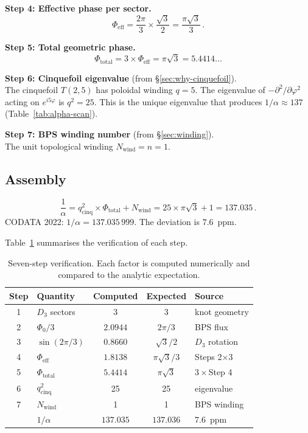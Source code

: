 \documentclass[11pt]{article}
\begin{document}
\medskip
\noindent\textbf{Step 4: Effective phase per sector.}
\[
\Phi_\text{eff} = \frac{2\pi}{3} \times \frac{\sqrt{3}}{2}
= \frac{\pi\sqrt{3}}{3}\,.
\]

\medskip
\noindent\textbf{Step 5: Total geometric phase.}
\[
\Phi_\text{total} = 3 \times \Phi_\text{eff}
= \pi\sqrt{3} = 5.4414\ldots
\]

\medskip
\noindent\textbf{Step 6: Cinquefoil eigenvalue} (from
\S\ref{sec:why-cinquefoil}).\\
The cinquefoil $T(2,5)$ has poloidal winding $q = 5$.  The
eigenvalue of $-\partial^2/\partial\varphi^2$ acting on
$e^{i5\varphi}$ is $q^2 = 25$.  This is the unique eigenvalue
that produces $1/\alpha \approx 137$
(Table~\ref{tab:alpha-scan}).

\medskip
\noindent\textbf{Step 7: BPS winding number} (from
\S\ref{sec:winding}).\\
The unit topological winding $N_\text{wind} = n = 1$.

\subsection{Assembly}
\begin{equation}
\label{eq:alpha}
\boxed{
  \frac{1}{\alpha}
  = q_\text{cinq}^2 \times \Phi_\text{total} + N_\text{wind}
  = 25 \times \pi\sqrt{3} + 1
  = 137.035\,.}
\end{equation}
CODATA 2022: $1/\alpha = 137.035\,999$.  The deviation is
$7.6$~ppm.

Table~\ref{tab:seven-steps} summarises the verification of each
step.

\begin{table}[h]
\centering
\caption{Seven-step verification.  Each factor is computed
numerically and compared to the analytic expectation.}
\label{tab:seven-steps}
\begin{tabular}{clccl}
\toprule
Step & Quantity & Computed & Expected & Source \\
\midrule
1 & $D_3$ sectors       & 3     & 3     & knot geometry\\
2 & $\Phi_0/3$          & $2.0944$ & $2\pi/3$ & BPS flux\\
3 & $\sin(2\pi/3)$      & $0.8660$ & $\sqrt{3}/2$ & $D_3$ rotation\\
4 & $\Phi_\text{eff}$   & $1.8138$ & $\pi\sqrt{3}/3$ & Steps 2$\times$3\\
5 & $\Phi_\text{total}$ & $5.4414$ & $\pi\sqrt{3}$ & $3\times$Step 4\\
6 & $q_\text{cinq}^2$   & 25    & 25    & eigenvalue\\
7 & $N_\text{wind}$     & 1     & 1     & BPS winding\\
\midrule
  & $1/\alpha$          & $137.035$ & $137.036$ & $7.6$~ppm\\
\bottomrule
\end{tabular}
\end{table}
\end{document}
